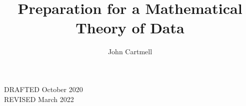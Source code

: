 \documentclass[10pt,a4paper]{article}
\theoremstyle{remark}
\begin{document}
\title{Preparation for a Mathematical Theory of Data}


\author{John Cartmell}

\date{}

\maketitle

\begin{center}
DRAFTED October 2020 \\
REVISED March 2022
\end{center}

\newcommand{\seenudgeup}[1]{\rule{0.1cm}{#1}}
\newcommand{\seenudgedown}[1]{\rule[-#1]{0.1cm}{0.1cm}}
\newcommand{\nudgeup}[1]{\rule{0cm}{#1}}
\newcommand{\nudgedown}[1]{\rule[-#1]{0cm}{0.1cm}}

\newcommand{\paralleldiag}[4]
{
 $
\rule[-0.3cm]{0pt}{0.9cm} %
\begin{array}{c p{0.5cm} c  }
 \Rnode{a}{#1}     &&   \Rnode{b}{#2}
\end{array} 
\begin{arrows}
\ncarc[nodesep=2pt,arcangle=10,offset=2pt]{->}{a}{b}
\alabel{#3}
\ncarc[nodesep=2pt,arcangle=-10,offset=-2pt]{->}{a}{b}
\blabel{#4}
\end{arrows}
$  
}


\newcommand{\sourcediag}[5]{
$
\begin{array}{c p{0.5cm} c  }
             &&   \Rnode{b}{#2} \\[0.01cm]
\Rnode{a}{#1} &&                \\[0.01cm] 
             &&   \Rnode{c}{#3} 
\end{array} 
\begin{arrows}
\ncarr{a}{b}
\alabel{#4}
\ncarr{a}{c}
\blabel{#5}
\end{arrows}
$  
}
\newcommand{\fgsourcediag}{\sourcediag{a}{b}{c}{f}{g}}

\newcommand{\fnsourceqnsource}
{
$
\begin{array}{c p{0.25cm} c  p{0.25cm} c }
             &&   \Rnode{b1}{b_1} &&              \\[0.4cm]
\Rnode{a}{a} &&                   && \Rnode{c}{c} \\[0.4cm]
             &&   \Rnode{bn}{b_n} &&              
\end{array} 
\begin{arrows}
\ncarr{a}{b1}
\alabel{f_1}
\ncarr{c}{b1}
\blabel{q_1} 
\ncarr{a}{bn}
\blabel{f_n}
\ncarr{c}{bn}
\alabel{q_n}
\end{arrows}
$   
}
\end{document}
